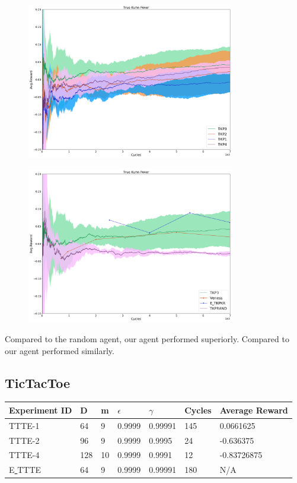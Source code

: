 \documentclass{article}
\theoremstyle{definition}
\newtheorem{primary statistics}[definition]{Primary Statistics}
\newtheorem{auxiliary statistics}[definition]{Auxiliary Statistics}
\begin{document}
 \begin{figure}[h]
 \centering
    \includegraphics[width=9.1cm]{4_True_Kuhn_Poker}
\end{figure}

 \begin{figure}[h]
 \centering
    \includegraphics[width=9.1cm]{True_Kuhn_Poker}
\end{figure}

Compared to the random agent, our agent performed superiorly. Compared to \citep{veness2011monte} our agent performed similarly.

\newpage

\subsection{TicTacToe}
\begin{tabular}{|l|l|l|l|l|l|l|}
 \hline \centering
 Experiment ID& D & m & $\epsilon$ & $\gamma$ & Cycles & Average Reward \\ \hline
TTTE-1   & 64        & 9           & 0.9999      & 0.99991           & 145    & 0.0661625         \\ \hline
TTTE-2   & 96        & 9           & 0.9999      & 0.9995            & 24     & -0.636375         \\ \hline
TTTE-4   & 128       & 10          & 0.9999      & 0.9991            & 12     & -0.83726875  \\  \hline  
E\underline{ }TTTE  & 64       & 9          & 0.9999      & 0.99991            & 180     & N/A  \\  \hline    
\end{tabular} 
\end{document}
